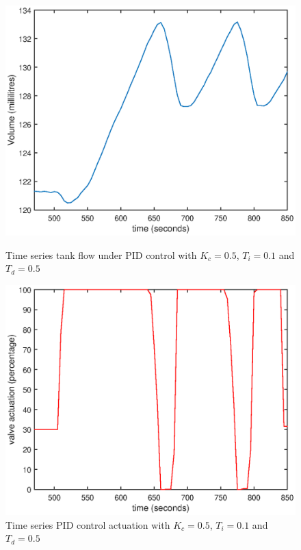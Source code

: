 \documentclass{article}
\begin{document}
\begin{figure}[h]
	\centering
	\begin{minipage}{0.45\textwidth}
		\centering
		\includegraphics[scale=0.4]{PID_Kc_05_Ti_01_Td_05}
		\caption{Time series tank flow under PID control with $K_c = 0.5$, $T_i = 0.1$ and $T_d = 0.5$}
	\end{minipage}
	\hspace{0.5cm}
	\begin{minipage}{0.45\textwidth}
		\centering
		\includegraphics[scale=0.4]{PID_Kc_05_Ti_01_Td_05_control}
		\caption{Time series PID control actuation with $K_c = 0.5$, $T_i = 0.1$ and $T_d = 0.5$}
	\end{minipage}
\end{figure}
\end{document}
